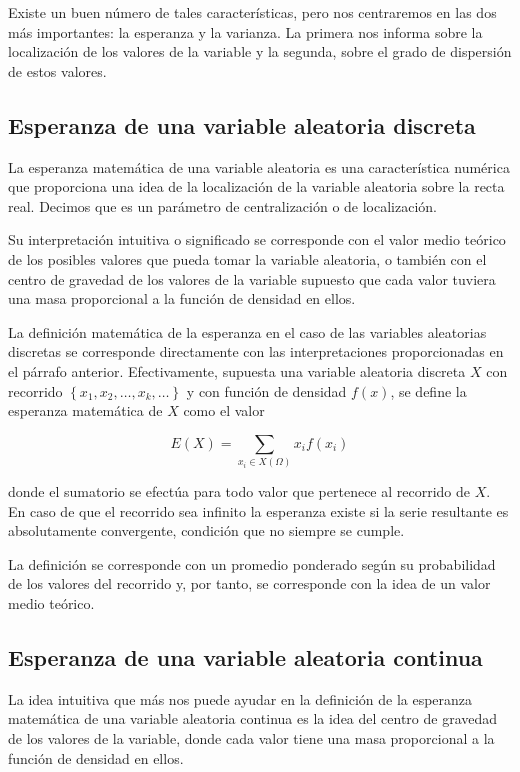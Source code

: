 \documentclass[
]{article}
\begin{document}
Existe un buen número de tales características, pero nos centraremos en
las dos más importantes: la esperanza y la varianza. La primera nos
informa sobre la localización de los valores de la variable y la
segunda, sobre el grado de dispersión de estos valores.

\subsection{Esperanza de una variable aleatoria discreta}\label{esperanza-de-una-variable-aleatoria-discreta}

La esperanza matemática de una variable aleatoria es una característica
numérica que proporciona una idea de la localización de la variable
aleatoria sobre la recta real. Decimos que es un parámetro de
centralización o de localización.

Su interpretación intuitiva o significado se corresponde con el valor
medio teórico de los posibles valores que pueda tomar la variable
aleatoria, o también con el centro de gravedad de los valores de la
variable supuesto que cada valor tuviera una masa proporcional a la
función de densidad en ellos.

La definición matemática de la esperanza en el caso de las variables
aleatorias discretas se corresponde directamente con las
interpretaciones proporcionadas en el párrafo anterior. Efectivamente,
supuesta una variable aleatoria discreta \(X\) con recorrido
\(\left\{x_{1}, x_{2}, \ldots, x_{k}, \ldots\right\}\) y con función de
densidad \(f(x)\), se define la esperanza matemática de \(X\) como el valor

\[
E(X)=\sum_{x_{i} \in X(\Omega)} x_{i} f\left(x_{i}\right)
\]

donde el sumatorio se efectúa para todo valor que pertenece al recorrido
de \(X\). En caso de que el recorrido sea infinito la esperanza existe si
la serie resultante es absolutamente convergente, condición que no
siempre se cumple.

La definición se corresponde con un promedio ponderado según su
probabilidad de los valores del recorrido y, por tanto, se corresponde
con la idea de un valor medio teórico.

\subsection{Esperanza de una variable aleatoria continua}\label{esperanza-de-una-variable-aleatoria-continua}

La idea intuitiva que más nos puede ayudar en la definición de la
esperanza matemática de una variable aleatoria continua es la idea del
centro de gravedad de los valores de la variable, donde cada valor tiene
una masa proporcional a la función de densidad en ellos.
\end{document}
